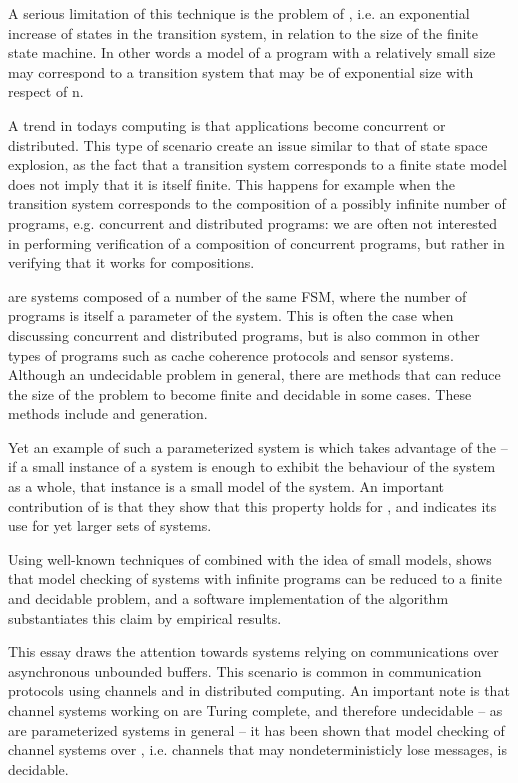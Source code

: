 A serious limitation of this technique is the problem of , i.e. an exponential increase of states in the transition system, in relation to the size of the finite state machine. In other words a model of a program with a relatively small size may correspond to a transition system that may be of exponential size with respect of n.

A trend in todays computing is that applications become concurrent or distributed. This type of scenario create an issue similar to that of state space explosion, as the fact that a transition system corresponds to a finite state model does not imply that it is itself finite. This happens for example when the transition system corresponds to the composition of a possibly infinite number of programs, e.g. concurrent and distributed programs: we are often not interested in performing verification of a  composition of concurrent programs, but rather in verifying that it works for  compositions.

 are systems composed of a number of the same FSM, where the number of programs is itself a parameter of the system. This is often the case when discussing concurrent and distributed programs, but is also common in other types of programs such as cache coherence protocols and sensor systems\cite{zuck2004}. Although an undecidable problem in general, there are methods that can reduce the size of the problem to become finite and decidable in some cases. These methods include \cite{counterabstraction} and  generation\cite{invinv}. 

Yet an example of such a parameterized system is \cite{parosh} which takes advantage of the  -- if a small instance of a system is enough to exhibit the behaviour of the system as a whole, that instance is a small model of the system. An important contribution of \cite{parosh} is that they show that this property holds for , and indicates its use for yet larger sets of systems. 

Using well-known techniques of  combined with the idea of small models, \cite{parosh} shows that model checking of systems with infinite programs can be reduced to a finite and decidable problem, and a software implementation of the algorithm substantiates this claim by empirical results.

This essay draws the attention towards systems relying on communications over asynchronous unbounded buffers. This scenario is common in communication protocols using channels and in distributed computing. An important note is that channel systems working on  are Turing complete, and therefore undecidable -- as are parameterized systems in general -- it has been shown that model checking of channel systems over , i.e. channels that may nondeterministicly lose messages, is decidable\cite{287591}\cite{gordon}.


